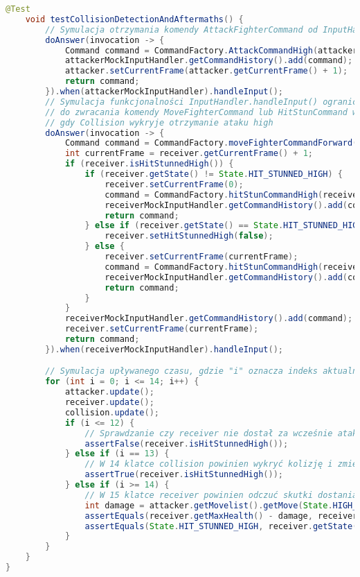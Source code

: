 \begin{lstlisting}[language=Java,style=JavaStyle,label=list:CollisionTest,caption=Test poprawnego wykrywania kolizji w klasie \texttt{Collision},
                   basicstyle=\footnotesize\ttfamily]
    @Test
    void testCollisionDetectionAndAftermaths() {
        // Symulacja otrzymania komendy AttackFighterCommand od InputHandler'a
        doAnswer(invocation -> {
            Command command = CommandFactory.AttackCommandHigh(attacker);
            attackerMockInputHandler.getCommandHistory().add(command);
            attacker.setCurrentFrame(attacker.getCurrentFrame() + 1);
            return command;
        }).when(attackerMockInputHandler).handleInput();
        // Symulacja funkcjonalności InputHandler.handleInput() ograniczającej się
        // do zwracania komendy MoveFighterCommand lub HitStunCommand w przypadku,
        // gdy Collision wykryje otrzymanie ataku high
        doAnswer(invocation -> {
            Command command = CommandFactory.moveFighterCommandForward(receiver);
            int currentFrame = receiver.getCurrentFrame() + 1;
            if (receiver.isHitStunnedHigh()) {
                if (receiver.getState() != State.HIT_STUNNED_HIGH) {
                    receiver.setCurrentFrame(0);
                    command = CommandFactory.hitStunCommandHigh(receiver);
                    receiverMockInputHandler.getCommandHistory().add(command);
                    return command;
                } else if (receiver.getState() == State.HIT_STUNNED_HIGH && currentFrame >= receiver.getMovelist().getMove(State.HIT_STUNNED_HIGH.ordinal()).getFrameCount()) {
                    receiver.setHitStunnedHigh(false);
                } else {
                    receiver.setCurrentFrame(currentFrame);
                    command = CommandFactory.hitStunCommandHigh(receiver);
                    receiverMockInputHandler.getCommandHistory().add(command);
                    return command;
                }
            }
            receiverMockInputHandler.getCommandHistory().add(command);
            receiver.setCurrentFrame(currentFrame);
            return command;
        }).when(receiverMockInputHandler).handleInput();

        // Symulacja upływanego czasu, gdzie "i" oznacza indeks aktualnej klatki
        for (int i = 0; i <= 14; i++) {
            attacker.update();
            receiver.update();
            collision.update();
            if (i <= 12) {
                // Sprawdzanie czy receiver nie dostał za wcześnie atakiem
                assertFalse(receiver.isHitStunnedHigh());
            } else if (i == 13) {
                // W 14 klatce collision powinien wykryć kolizję i zmienić flagę isHitStunnedHigh na true
                assertTrue(receiver.isHitStunnedHigh());
            } else if (i >= 14) {
                // W 15 klatce receiver powinien odczuć skutki dostania atakiem high
                int damage = attacker.getMovelist().getMove(State.HIGH_ATTACK.getId()).getDamage();
                assertEquals(receiver.getMaxHealth() - damage, receiver.getHealth());
                assertEquals(State.HIT_STUNNED_HIGH, receiver.getState());
            }
        }
    }
}
\end{lstlisting}


